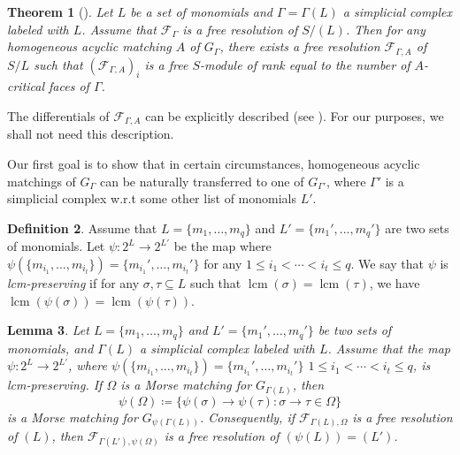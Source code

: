 \documentclass[reqno]{amsart}
\DeclareMathOperator{\lcm}{lcm}
\newtheorem{theorem}{Theorem}[section]
\newtheorem{lemma}[theorem]{Lemma}
\theoremstyle{definition}
\newtheorem{definition}[theorem]{Definition}
\theoremstyle{remark}
\numberwithin{equation}{section}
\begin{document}
\begin{theorem}[]\label{thm:Morse-theory}
    Let $L$ be a set of monomials and $\Gamma=\Gamma(L)$ a simplicial complex labeled with $L$. Assume that $\mathcal{F}_\Gamma$ is a free resolution of $S/(L)$. Then for any homogeneous acyclic matching $A$ of $G_\Gamma$, there exists a free resolution $\mathcal{F}_{\Gamma,A}$ of $S/L$ such that $(\mathcal{F}_{\Gamma,A})_i$ is a free $S$-module of rank equal to the number of $A$-critical faces of $\Gamma$. 
\end{theorem}

The differentials of $\mathcal{F}_{\Gamma,A}$ can be explicitly described (see \cite[Lemma 7.7]{BW02}). For our purposes, we shall not need this description.

Our first goal is to show that in certain circumstances, homogeneous acyclic matchings of $G_\Gamma$ can be naturally transferred to one of $G_{\Gamma'}$, where $\Gamma'$ is a simplicial complex w.r.t some other list of monomials $L'$. 

\begin{definition}
    Assume that $L=\{m_1,\dots, m_q\}$ and $L'=\{m_1',\dots, m_q'\}$ are two sets of monomials. Let $\psi:2^L\to 2^{L'}$ be the map where $\psi(\{m_{i_1},\dots, m_{i_t}\})=\{m_{i_1}
    ',\dots, m_{i_t}'\}$ for any $1\leq i_1<\cdots <i_t\leq q$.   
    We say that $\psi$ is \emph{lcm-preserving} if for any $\sigma,\tau\subseteq L$ such that $\lcm(\sigma)=\lcm(\tau)$, we have $\lcm({\psi}(\sigma))=\lcm({\psi}(\tau))$.
\end{definition}




\begin{lemma}\label{lem:Morse-transfer}
    Let $L=\{m_1,\dots, m_q\}$ and $L'=\{m_1',\dots, m_q'\}$ be two  sets of monomials, and $\Gamma(L)$ a simplicial complex labeled with $L$. Assume that the map $\psi:2^L\to 2^{L'}$, where $\psi(\{m_{i_1},\dots, m_{i_t}\})=\{m_{i_1}
    ',\dots, m_{i_t}'\}$ $1\leq i_1<\cdots <i_t\leq q$, is lcm-preserving.
    If $\Omega$ is a Morse matching for $G_{\Gamma(L)}$, then \[
    \psi(\Omega)\coloneqq \{ \psi(\sigma)\to \psi(\tau) \colon \sigma\to \tau\in \Omega\}\]
    is a Morse matching for $G_{\psi(\Gamma(L))}$. Consequently, if $\mathcal{F}_{\Gamma(L),\Omega}$ is a free resolution of $(L)$, then $\mathcal{F}_{\Gamma(L'),\psi(\Omega)}$ is a free resolution of $(\psi(L))=(L')$.
\end{lemma}
\end{document}
